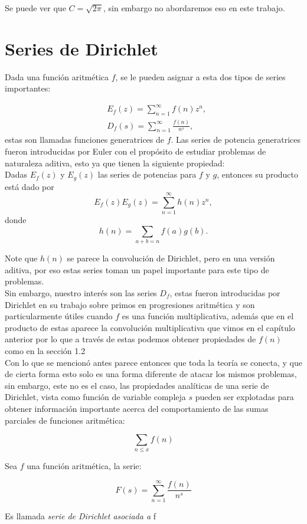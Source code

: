 Se puede ver que $C=\sqrt{2\pi}$, sin embargo no abordaremos eso en este trabajo.

\section{Series de Dirichlet}

Dada una función aritmética $f$, se le pueden asignar a esta dos tipos de series importantes:

$$
\begin{aligned}
& E_f(z)=\sum_{n=1}^{\infty} f(n) z^n, \\
& D_f(s)=\sum_{n=1}^{\infty} \frac{f(n)}{n^s},
\end{aligned}
$$
estas son llamadas funciones generatrices de $f$.
Las series de potencia generatrices fueron introducidas por Euler con el propósito de estudiar problemas de naturaleza aditiva, esto ya que tienen la siguiente propiedad:\\

Dadas $E_f(z)$ y $E_g(z)$ las series de potencias para $f$ y $g$, entonces su producto está dado por
$$
E_f(z) E_g(z)=\sum_{n=1}^{\infty} h(n) z^n,
$$
donde
$$
h(n)=\sum_{a+b=n} f(a) g(b) .
$$

Note que $h(n)$ se parece la convolución de Dirichlet, pero en una versión aditiva, por eso estas series toman un papel importante para este tipo de problemas.\\

Sin embargo, nuestro interés son las series $D_f$, estas fueron introducidas por Dirichlet en su trabajo sobre primos en progresiones aritmética y son particularmente útiles cuando $f$ es una función multiplicativa, además que en el producto de estas aparece la convolución multiplicativa que vimos en el capítulo anterior por lo que a través de estas podemos obtener propiedades de $f(n)$ como en la sección 1.2\\

Con lo que se mencionó antes parece entonces que toda la teoría se conecta, y que de cierta forma esto solo es una forma diferente de atacar los mismos problemas, sin embargo, este no es el caso, las propiedades analíticas de una serie de Dirichlet, vista como función de variable compleja $s$ pueden ser explotadas para obtener información importante acerca del comportamiento de las sumas parciales de funciones aritmética:

$$\sum_{n\leq x}f(n)$$

\begin{definition}

Sea $f$ una función aritmética, la serie:

$$F(s)=\sum_{n=1}^{\infty}\frac{f(n)}{n^s}$$

Es llamada \textit{serie de Dirichlet asociada a} f

\end{definition}

